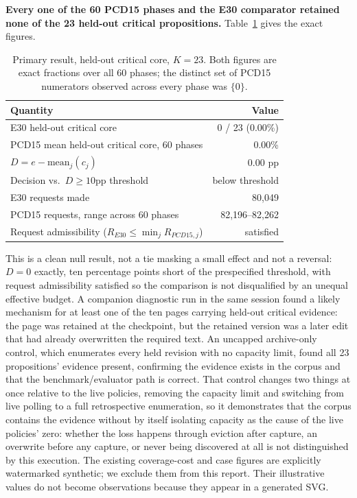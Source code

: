 \documentclass[11pt]{article}
\begin{document}
\textbf{Every one of the 60 PCD15 phases and the E30 comparator retained none of the 23 held-out critical propositions.} Table~\ref{tab:primary} gives the exact figures.

\begin{table}[ht]
\centering
\caption{Primary result, held-out critical core, $K=23$. Both figures are exact fractions over all 60 phases; the distinct set of PCD15 numerators observed across every phase was $\{0\}$.}
\label{tab:primary}
\begin{tabular}{lr}
\toprule
Quantity & Value\\
\midrule
E30 held-out critical core & 0 / 23 (0.00\%)\\
PCD15 mean held-out critical core, 60 phases & 0.00\%\\
$D = e - \text{mean}_j(c_j)$ & 0.00 pp\\
Decision vs.\ $D \geq 10$pp threshold & below threshold\\
E30 requests made & 80{,}049\\
PCD15 requests, range across 60 phases & 82{,}196--82{,}262\\
Request admissibility ($R_{E30} \leq \min_j R_{PCD15,j}$) & satisfied\\
\bottomrule
\end{tabular}
\end{table}

This is a clean null result, not a tie masking a small effect and not a reversal: $D=0$ exactly, ten percentage points short of the prespecified threshold, with request admissibility satisfied so the comparison is not disqualified by an unequal effective budget. A companion diagnostic run in the same session found a likely mechanism for at least one of the ten pages carrying held-out critical evidence: the page was retained at the checkpoint, but the retained version was a later edit that had already overwritten the required text. An uncapped archive-only control, which enumerates every held revision with no capacity limit, found all 23 propositions' evidence present, confirming the evidence exists in the corpus and that the benchmark/evaluator path is correct. That control changes two things at once relative to the live policies, removing the capacity limit and switching from live polling to a full retrospective enumeration, so it demonstrates that the corpus contains the evidence without by itself isolating capacity as the cause of the live policies' zero: whether the loss happens through eviction after capture, an overwrite before any capture, or never being discovered at all is not distinguished by this execution. The existing coverage-cost and case figures are explicitly watermarked synthetic; we exclude them from this report. Their illustrative values do not become observations because they appear in a generated SVG.
\end{document}

